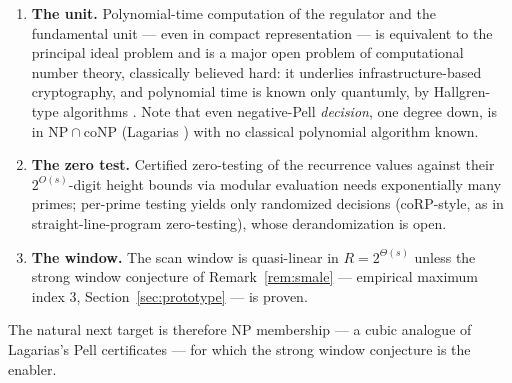 \documentclass[11pt]{amsart}
\theoremstyle{plain}
\theoremstyle{remark}
\begin{document}
\begin{enumerate}
\item \textbf{The unit.} Polynomial-time computation of the regulator
  and the fundamental unit --- even in compact representation --- is
  equivalent to the principal ideal problem and is a major open
  problem of computational number theory, classically believed hard:
  it underlies infrastructure-based cryptography, and polynomial time
  is known only quantumly, by Hallgren-type algorithms \cite{Hal07}.
  Note that even negative-Pell \emph{decision}, one degree down, is in
  $\mathrm{NP} \cap \mathrm{coNP}$ (Lagarias \cite{Lag79}) with no
  classical polynomial algorithm known.
\item \textbf{The zero test.} Certified zero-testing of the recurrence
  values against their $2^{O(s)}$-digit height bounds via modular
  evaluation needs exponentially many primes; per-prime testing
  yields only randomized decisions (coRP-style, as in
  straight-line-program zero-testing), whose derandomization is open.
\item \textbf{The window.} The scan window is quasi-linear in
  $R = 2^{\Theta(s)}$ unless the strong window conjecture of
  Remark~\ref{rem:smale} --- empirical maximum index 3,
  Section~\ref{sec:prototype} --- is proven.
\end{enumerate}

The natural next target is therefore NP membership --- a cubic
analogue of Lagarias's Pell certificates \cite{Lag79} --- for which
the strong window conjecture is the enabler.

\end{document}
